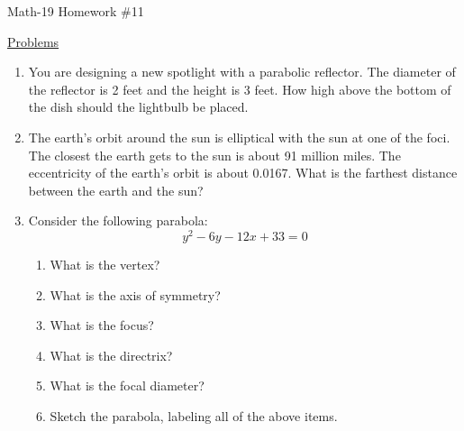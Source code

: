 \documentclass[letterpaper,12pt,fleqn]{article}
\begin{document}
\begin{center}
\Large Math-19 Homework \#11
\end{center}

\vspace{0.5in}

\underline{Problems}

\begin{enumerate}
\item You are designing a new spotlight with a parabolic reflector. The
  diameter of the reflector is 2 feet and the height is 3 feet. How high above
  the bottom of the dish should the lightbulb be placed.

\item The earth's orbit around the sun is elliptical with the sun at one of
  the foci. The closest the earth gets to the sun is about 91 million miles.
  The eccentricity of the earth's orbit is about 0.0167. What is the farthest
  distance between the earth and the sun?

\item Consider the following parabola:
  \[y^2-6y-12x+33=0\]
  \begin{enumerate}
  \item What is the vertex?
  \item What is the axis of symmetry?
  \item What is the focus?
  \item What is the directrix?
  \item What is the focal diameter?
  \item Sketch the parabola, labeling all of the above items.
  \end{enumerate}


\end{enumerate}
\end{document}

